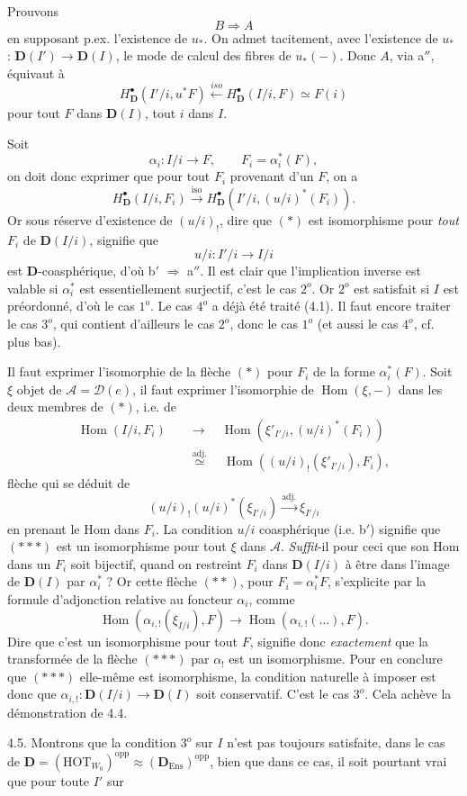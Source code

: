 \documentclass[11pt]{article}
\newcommand{\printedpage}[1]{\marginpar{\footnotesize p.~#1}}
\newcommand{\msp}[1]{\marginpar{\footnotesize [#1]}}
\newcommand{\Hom}{\operatorname{Hom}}
\newcommand{\bD}{\mathbf{D}}
\begin{document}
Prouvons
\[
B \Longrightarrow A
\]
en supposant p.ex. l'existence de $u_*$. On admet tacitement, avec l'existence de $u_*$ : $\bD(I') \longrightarrow \bD(I)$, le mode de calcul des fibres de $u_*(-)$. Donc $A$, via a$''$, équivaut à
\[
H^{\bullet}_{\bD}(I'/i, u^*F) \xleftarrow{\mathit{iso}} H^{\bullet}_{\bD}(I/i, F) \simeq F(i)
\]
\printedpage{38}
pour tout $F$ dans $\bD(I)$, tout $i$ dans $I$.

Soit
\[
\alpha_i : I/i \longrightarrow F, \qquad F_i = \alpha_i^*(F), %
\]
on doit donc exprimer que pour tout $F_i$ provenant d'un $F$, on a
\[
H^{\bullet}_{\bD}(I/i, F_i) \xrightarrow{\mathrm{iso}} H^{\bullet}_{\bD}(I'/i, (u/i)^*(F_i)). \tag*{$(\ast)$}
\]
Or sous réserve d'existence de $(u/i)_!$, dire que $(\ast)$ est isomorphisme pour \textit{tout} $F_i$ de $\bD(I/i)$, signifie que
\[
u/i : I'/i \longrightarrow I/i
\]
\msp{page 62}est $\bD$-coasphérique, d'où b$'$ $\Longrightarrow$ a$''$. Il est clair que l'implication inverse est valable si $\alpha_i^*$ est essentiellement surjectif, c'est le cas $2^o$. Or $2^o$ est satisfait si $I$ est préordonné, d'où le cas $1^o$. Le cas $4^o$ a déjà été traité (4.1). Il faut encore traiter le cas $3^o$, qui contient d'ailleurs le cas $2^o$, donc le cas $1^o$ (et aussi le cas $4^o$, cf. plus bas).

Il faut exprimer l'isomorphie de la flèche $(\ast)$ pour $F_i$ de la forme $\alpha_i^*(F)$. Soit $\xi$ objet de $\mathcal{A} = \mathcal{D}(e)$, il faut exprimer l'isomorphie de $\Hom(\xi, -)$ dans les deux membres de $(\ast)$, i.e. de
\[
\begin{aligned}
\Hom(I/i, F_i) \quad &\longrightarrow \quad \Hom(\xi'_{I'/i}, (u/i)^*(F_i)) \\
&\overset{\text{adj.}}{\simeq} \quad \Hom((u/i)_!(\xi'_{I'/i}), F_i),
\end{aligned}
\tag*{$(\ast\ast)$}
\]
 flèche qui se déduit de
\[
(u/i)_!(u/i)^*(\xi_{I'/i}) \xrightarrow{\text{adj.}} \xi_{I'/i} \tag*{$(\ast\ast\ast)$}
\]
en prenant le Hom dans $F_i$. La condition $u/i$ coasphérique (i.e. b$'$) signifie que $(\ast\ast\ast)$ est un isomorphisme pour tout $\xi$ dans $\mathcal{A}$. \textit{Suffit}-il pour ceci que son Hom dans un $F_i$ soit bijectif, quand on restreint $F_i$ dans $\bD(I/i)$ à être dans l'image de $\bD(I)$ par $\alpha_i^*$ ? Or cette flèche $(\ast\ast)$, pour $F_i = \alpha_i^*F$, s'explicite par la formule d'adjonction relative \msp{page 63}au foncteur $\alpha_i$, comme
\[
\Hom(\alpha_{i,!}(\xi_{I/i}), F) \longrightarrow \Hom(\alpha_{i,!}(\ldots), F).
\]
Dire que c'est un isomorphisme pour tout $F$, signifie donc \textit{exactement} que la transformée de la flèche $(\ast\ast\ast)$ par $\alpha_!$ est un isomorphisme. Pour en conclure que $(\ast\ast\ast)$ elle-même est isomorphisme, la condition naturelle à imposer est donc que $\alpha_{i,!} : \bD(I/i) \longrightarrow \bD(I)$ soit conservatif. C'est le cas $3^o$. Cela achève la démonstration de 4.4.

4.5. Montrons que la condition $3^o$ sur $I$ n'est pas toujours satisfaite, dans le cas de $\bD = (\mathrm{HOT}_{W_0})^{\mathrm{opp}} \approx (\bD_{\mathrm{Ens}})^{\mathrm{opp}}$, bien que dans ce cas, il soit pourtant vrai que pour toute $I'$ sur
\end{document}
